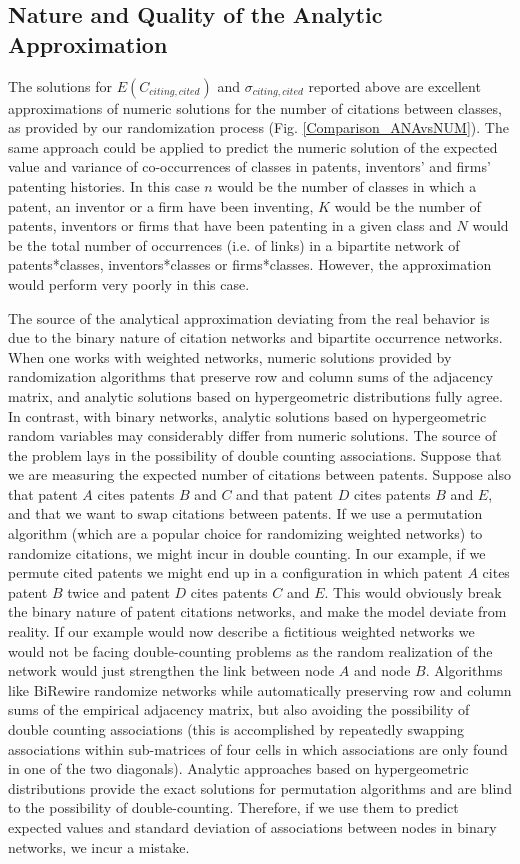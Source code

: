 \documentclass[pre,reprint,groupedaddress,superscriptaddress]{revtex4-1}
\begin{document}
\subsection{Nature and Quality of the Analytic Approximation}
The solutions for $E(C_{citing,cited})$ and $\sigma_{citing,cited}$ reported above are excellent approximations of numeric solutions  for the number of citations between classes, as provided by our randomization process (Fig. \ref{Comparison_ANAvsNUM}). The same approach could be applied to predict the numeric solution of the expected value and variance of co-occurrences of classes in patents, inventors' and firms' patenting histories. In this case $n$ would be the number of classes in which a patent, an inventor or a firm have been inventing, $K$ would be the number of patents, inventors or firms that have been patenting in a given class and $N$ would be the total number of occurrences (i.e. of links) in a bipartite network of patents*classes, inventors*classes or firms*classes. However, the approximation would perform very poorly in this case. 

The source of the analytical approximation deviating from the real behavior is due to the binary nature of citation networks and bipartite occurrence networks. When one works with weighted networks, numeric solutions provided by randomization algorithms that preserve row and column sums of the adjacency matrix, and analytic solutions based on hypergeometric distributions fully agree. In contrast, with binary networks, analytic solutions based on hypergeometric random variables may considerably differ from numeric solutions. The source of the problem lays in the possibility of double counting associations. Suppose that we are measuring the expected number of citations between patents. Suppose also that patent $A$ cites patents $B$ and $C$ and that patent $D$ cites patents $B$ and $E$, and that we want to swap citations between patents. If we use a permutation algorithm (which are a popular choice for randomizing weighted networks) to randomize citations, we might incur in double counting. In our example, if we permute cited patents we might end up in a configuration in which patent $A$ cites patent $B$ twice and patent $D$ cites patents $C$ and $E$. This would obviously break the binary nature of patent citations networks, and make the model deviate from reality. If our example would now describe a fictitious weighted networks we would not be facing double-counting problems as the random realization of the network would just strengthen the link between node $A$ and node $B$. Algorithms like BiRewire randomize networks while automatically preserving row and column sums of the empirical adjacency matrix, but also avoiding the possibility of double counting associations (this is accomplished by repeatedly swapping associations within sub-matrices of four cells in which associations are only found in one of the two diagonals). Analytic approaches based on hypergeometric distributions provide the exact solutions for permutation algorithms and are blind to the possibility of double-counting. Therefore, if we use them to predict expected values and standard deviation of associations between nodes in binary networks, we incur a mistake.
\end{document}

